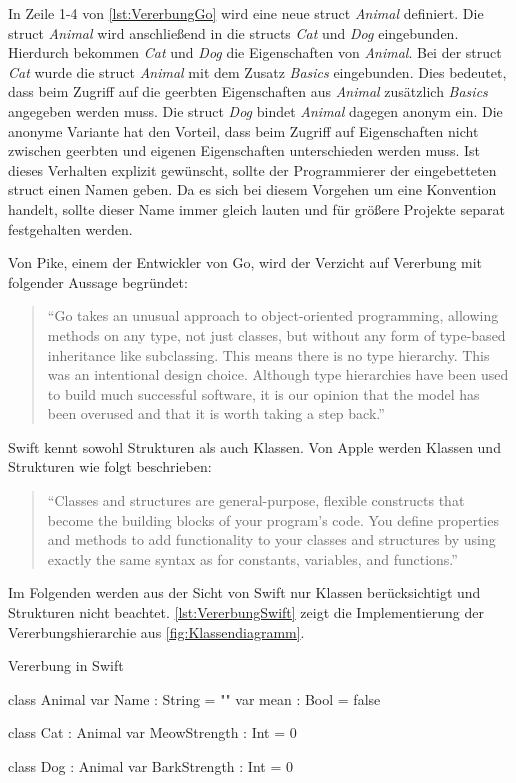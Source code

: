 In Zeile 1-4 von \autoref{lst:VererbungGo} wird eine neue struct \emph{Animal} definiert.
Die struct \emph{Animal} wird anschließend in die structs \emph{Cat} und \emph{Dog} eingebunden. 
Hierdurch bekommen \emph{Cat} und \emph{Dog} die Eigenschaften von \emph{Animal}.
Bei der struct \emph{Cat} wurde die struct \emph{Animal} mit dem Zusatz \emph{Basics} eingebunden. 
Dies bedeutet, dass beim Zugriff auf die geerbten Eigenschaften aus \emph{Animal} zusätzlich \emph{Basics} angegeben werden muss. 
Die struct \emph{Dog} bindet \emph{Animal} dagegen anonym ein. 
Die anonyme Variante hat den Vorteil, dass beim Zugriff auf Eigenschaften nicht zwischen geerbten und eigenen Eigenschaften unterschieden werden muss.
Ist dieses Verhalten explizit gewünscht, sollte der Programmierer der eingebetteten struct einen Namen geben.
Da es sich bei diesem Vorgehen um eine Konvention handelt, sollte dieser Name immer gleich lauten und für größere Projekte separat festgehalten werden. 

Von Pike, einem der Entwickler von Go, wird der Verzicht auf Vererbung mit folgender Aussage begründet:
\begin{quote}
\enquote{Go takes an unusual approach to object-oriented programming, allowing methods on any type, not just classes, but without any form of type-based inheritance like subclassing. This means there is no type hierarchy. This was an intentional design choice. Although type hierarchies have been used to build much successful software, it is our opinion that the model has been overused and that it is worth taking a step back.} \cite[]{RobPike.2012}
\end{quote}

Swift kennt sowohl Strukturen als auch Klassen. Von Apple werden Klassen und Strukturen wie folgt beschrieben:
\begin{quote}
\enquote{Classes and structures are general-purpose, flexible constructs that become the building blocks of your program’s code. You define properties and methods to add functionality to your classes and
structures by using exactly the same syntax as for constants, variables, and functions.} \cite[S.183]{Apple.2017}
\end{quote}

Im Folgenden werden aus der Sicht von Swift nur Klassen berücksichtigt und Strukturen nicht beachtet.
\autoref{lst:VererbungSwift} zeigt die Implementierung der Vererbungshierarchie aus \autoref{fig:Klassendiagramm}.

\begin{listing}[H]
\caption{Vererbung in Swift}
\label{lst:VererbungSwift}
\begin{SwiftCode}
class Animal{
    var Name : String = ""
    var mean : Bool = false
}

class Cat : Animal{
    var MeowStrength : Int = 0
}

class Dog : Animal{
    var BarkStrength : Int = 0
}
\end{SwiftCode}
\end{listing}

